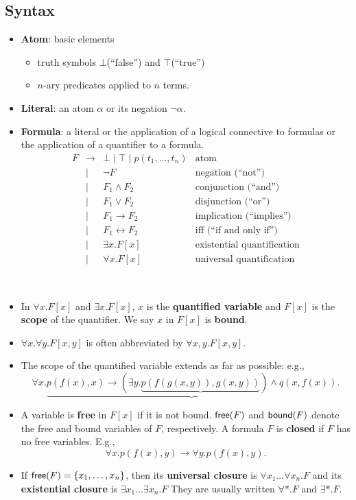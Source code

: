 \subsection{Syntax}
\begin{itemize}
	\item \textbf{Atom}: basic elements
	\begin{itemize}
		\item truth symbols $\bot$(``false'') and $\top$(``true'')
		\item $n$-ary predicates applied to $n$ terms.
	\end{itemize}
	\item \textbf{Literal}: an atom $\alpha$ or its negation $\lnot\alpha$.
	\item \textbf{Formula}: a literal or the application of a logical connective to formulas or the application of a quantifier to a formula.
	\[
	\begin{array}{ccll}
		F & \to & \bot\mid\top\mid p(t_1,\dots,t_n) & \text{atom}\\
		& | & \lnot F & \text{negation (``not'')} \\
		& | & F_1\land F_2 & \text{conjunction (``and'')} \\
		& | & F_1\lor F_2 & \text{disjunction (``or'')} \\
		& | & F_1\to F_2 & \text{implication (``implies'')} \\
		& | & F_1\leftrightarrow F_2 & \text{iff (``if and only if'')} \\
		& | & \exists x.F[x] & \text{existential quantification}\\
		& | & \forall x.F[x] & \text{universal quantification}
	\end{array}
	\]
\end{itemize}
\begin{remark}
\ \begin{itemize}
	\item In $\forall x.F[x]$ and $\exists x.F[x]$, $x$ is the \textbf{quantified variable} and $F[x]$ is the \textbf{scope} of the quantifier. We say $x$ in $F[x]$ is \textbf{bound}.
	\item $\forall x.\forall y.F[x,y]$ is often abbreviated by $\forall x,y.F[x,y]$.
	\item The scope of the quantified variable extends as far as possible: e.g., \[
	\forall x.\underbrace{p(f(x),x)\to(\exists y.\underbrace{p(f(g(x,y)),g(x,y))})\land q(x,f(x))}.
	\]
	\item A variable is \textbf{free} in $F[x]$ if it is not bound. $\mathsf{free}(F)$ and $\mathsf{bound}(F)$ denote the free and bound variables of $F$, respectively. A formula $F$ is \textbf{closed} if $F$ has no free variables. E.g., \[
	\forall x.p(f(x),y)\to\forall y.p(f(x),y).
	\]
	\item If $\mathsf{free}(F)=\set{x_1,\dots, x_n}$, then its \textbf{universal closure} is $\forall x_1\dots\forall x_n.F$ and its \textbf{existential closure} is $\exists x_1\dots\exists x_n.F$ They are usually written $\forall *.F$ and $\exists*.F$.
\end{itemize}
\end{remark}

